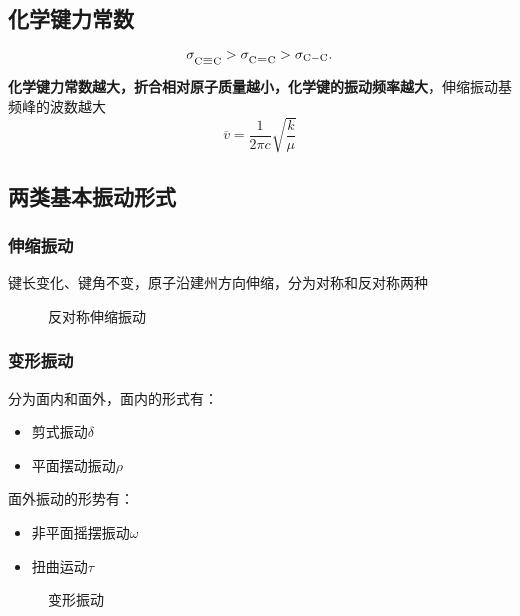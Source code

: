 \subsection{化学键力常数}%
\label{sub:化学键力常数}
 \[
    \sigma_{\ce{C#C}}>\sigma_{\ce{C=C}}>\sigma_{\ce{C-C}}
.\]
\textbf{化学键力常数越大，折合相对原子质量越小，化学键的振动频率越大}，伸缩振动基频峰的波数越大
\begin{equation}
    \label{eq:vbar}
    \overline{v} = \frac{1}{2\pi c}\sqrt{\frac{k}{\mu}}
\end{equation}
\subsection{两类基本振动形式}%
\label{sub:两类基本振动形式}
\subsubsection*{伸缩振动}%
\label{subsub*:伸缩振动}
键长变化、键角不变，原子沿建州方向伸缩，分为对称和反对称两种
\begin{figure}[ht!]
    \centering
    \caption{反对称伸缩振动}
    \label{fig:反对称伸缩振动}
\end{figure}
\subsubsection*{变形振动}%
\label{subsub*:变形振动}
分为面内和面外，面内的形式有：
\begin{itemize}
    \item 剪式振动$\delta$
    \item 平面摆动振动$\rho$
\end{itemize}
面外振动的形势有：
\begin{itemize}
    \item 非平面摇摆振动$\omega$
    \item 扭曲运动$\tau$
\end{itemize}
\begin{figure}[ht!]
    \centering
    \caption{变形振动}
    \label{fig:变形振动}
\end{figure}
